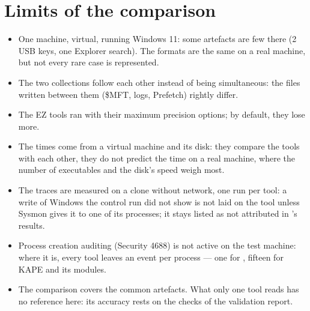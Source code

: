 \documentclass[11pt,a4paper,oneside]{report}
\begin{document}
\chapter{Limits of the comparison}\label{chap:limites}

\begin{itemize}
  \item One machine, virtual, running Windows 11: some artefacts are few there
        (2 USB keys, one Explorer search). The formats are the same on a real
        machine, but not every rare case is represented.
  \item The two collections follow each other instead of being simultaneous: the
        files written between them (\$MFT, logs, Prefetch) rightly differ.
  \item The EZ tools ran with their maximum precision options; by default, they
        lose more.
  \item The times come from a virtual machine and its disk: they compare the
        tools with each other, they do not predict the time on a real machine,
        where the number of executables and the disk's speed weigh most.
  \item The traces are measured on a clone without network, one run per tool: a
        write of Windows the control run did not show is not laid on the tool
        unless Sysmon gives it to one of its processes; it stays listed as not
        attributed in 's results.
  \item Process creation auditing (Security 4688) is not active on the test
        machine: where it is, every tool leaves an event per process --- one for
        \wac{}, fifteen for KAPE and its modules.
  \item The comparison covers the common artefacts. What only one tool reads has
        no reference here: its accuracy rests on the checks of the validation
        report.
\end{itemize}
\end{document}
